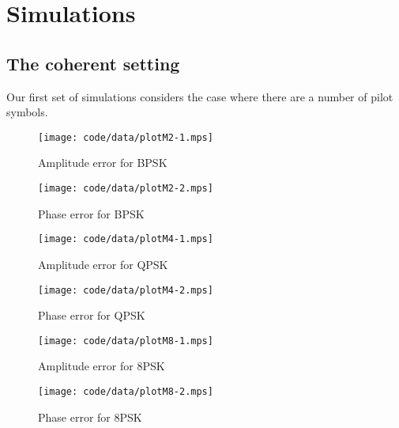 \documentclass[a4paper,10pt]{article}
\begin{document}
\section{Simulations}\label{sec:simulations}

\subsection{The coherent setting}

Our first set of simulations considers the case where there are a number of pilot symbols.

\begin{figure*}[tp]
	\centering
		\texttt{[image: code/data/plotM2-1.mps]}
		\caption{Amplitude error for BPSK}
		\label{fig:plotamp}
\end{figure*}


\begin{figure*}[tp]
	\centering
		\texttt{[image: code/data/plotM2-2.mps]}
		\caption{Phase error for BPSK}
		\label{fig:plotphase}
\end{figure*}


\begin{figure*}[tp]
	\centering
		\texttt{[image: code/data/plotM4-1.mps]}
		\caption{Amplitude error for QPSK}
		\label{fig:plotamp}
\end{figure*}


\begin{figure*}[tp]
	\centering
		\texttt{[image: code/data/plotM4-2.mps]}
		\caption{Phase error for QPSK}
		\label{fig:plotphase}
\end{figure*}


\begin{figure*}[tp]
	\centering
		\texttt{[image: code/data/plotM8-1.mps]}
		\caption{Amplitude error for 8PSK}
		\label{fig:plotamp}
\end{figure*}


\begin{figure*}[tp]
	\centering
		\texttt{[image: code/data/plotM8-2.mps]}
		\caption{Phase error for 8PSK}
		\label{fig:plotphase}
\end{figure*}
\end{document}

